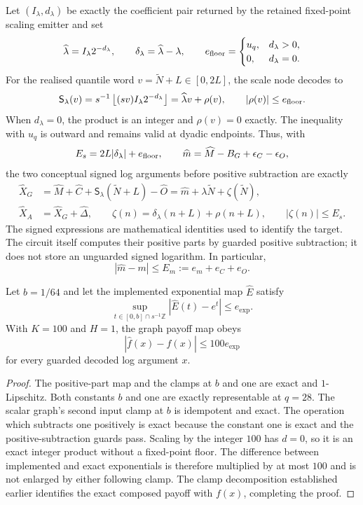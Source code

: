 Let $(I_\lambda,d_\lambda)$ be exactly the coefficient pair returned by
the retained fixed-point scaling emitter and set
\[
 \widehat\lambda=I_\lambda 2^{-d_\lambda},
 \qquad \delta_\lambda=\widehat\lambda-\lambda,
 \qquad
 e_{\rm floor}=\begin{cases}u_q,&d_\lambda>0,\\0,&d_\lambda=0.\end{cases}
\]
For the realised quantile word $v=\widetilde N+L\in[0,2L]$, the scale
node decodes to
\[
 \mathsf S_\lambda(v)
 =s^{-1}\left\lfloor (sv)I_\lambda 2^{-d_\lambda}\right\rfloor
 =\widehat\lambda v+\rho(v),
 \qquad |\rho(v)|\leq e_{\rm floor}.
\]
When $d_\lambda=0$, the product is an integer and $\rho(v)=0$ exactly.
The inequality with $u_q$ is outward and remains valid at dyadic endpoints.
Thus, with
\[
 E_s=2L|\delta_\lambda|+e_{\rm floor},\qquad
 \widehat m=\widehat M-B_G+\epsilon_C-\epsilon_O,
\]
the two conceptual signed log arguments before positive subtraction are
exactly
\begin{align*}
 \widehat X_G
 &=\widehat M+\widehat C+
     \mathsf S_\lambda(\widetilde N+L)-\widehat O
   =\widehat m+\lambda\widetilde N+\zeta(\widetilde N),\\
 \widehat X_A
 &=\widehat X_G+\widehat\Delta,
 \qquad
 \zeta(n)=\delta_\lambda(n+L)+\rho(n+L),
 \qquad |\zeta(n)|\leq E_s.
\end{align*}
The signed expressions are mathematical identities used to identify the
target. The circuit itself computes their positive parts by guarded
positive subtraction; it does not store an unguarded signed logarithm.
In particular,
\[
 |\widehat m-m|\leq E_m:=e_m+e_C+e_O.
\]

\begin{lemma}
\label{lem:raw-payoff-scalar-error}
Let $b=1/64$ and let the implemented exponential map $\widehat E$ satisfy
\[
 \sup_{t\in[0,b]\cap s^{-1}\mathbb Z}
 |\widehat E(t)-e^t|\leq e_{\exp}.
\]
With $K=100$ and $H=1$, the graph payoff map obeys
\[
 |\widehat f(x)-f(x)|\leq100e_{\exp}
\]
for every guarded decoded log argument $x$.
\end{lemma}
\begin{proof}
The positive-part map and the clamps at $b$ and one are exact and
$1$-Lipschitz. Both constants $b$ and one are exactly representable at
$q=28$. The scalar graph's second input clamp at $b$ is idempotent and
exact. The operation which subtracts one positively is exact because
the constant one is exact and the positive-subtraction guards pass.
Scaling by the integer $100$ has $d=0$, so it is an exact integer product
without a fixed-point floor. The difference between implemented and exact
exponentials is therefore multiplied by at most $100$ and is not enlarged
by either following clamp. The clamp decomposition established earlier
identifies the exact composed payoff with $f(x)$, completing the proof.
\end{proof}

